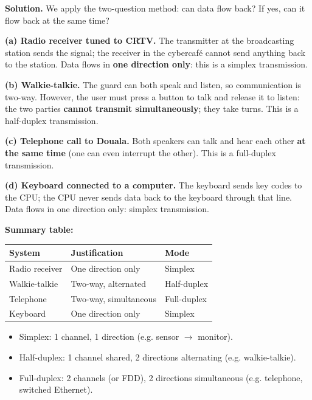\documentclass[11pt]{article}
\newcommand{\cle}[1]{{\popxbold\color{popdark}#1}}
\begin{document}
\begin{exoresolu}
\textbf{Solution.} We apply the two-question method: can data flow back? If yes, can it flow back at the same time?

\textbf{(a) Radio receiver tuned to CRTV.} The transmitter at the broadcasting station sends the signal; the receiver in the cybercaf\'e cannot send anything back to the station. Data flows in \textbf{one direction only}: this is a \cle{simplex} transmission.

\textbf{(b) Walkie-talkie.} The guard can both speak and listen, so communication is two-way. However, the user must press a button to talk and release it to listen: the two parties \textbf{cannot transmit simultaneously}; they take turns. This is a \cle{half-duplex} transmission.

\textbf{(c) Telephone call to Douala.} Both speakers can talk and hear each other \textbf{at the same time} (one can even interrupt the other). This is a \cle{full-duplex} transmission.

\textbf{(d) Keyboard connected to a computer.} The keyboard sends key codes to the CPU; the CPU never sends data back to the keyboard through that line. Data flows in one direction only: \cle{simplex} transmission.

\textbf{Summary table:}
\begin{center}
\begin{tabularx}{\linewidth}{|l|X|l|}
\hline
\rowcolor{popblueL} \textbf{System} & \textbf{Justification} & \textbf{Mode} \\
\hline
Radio receiver & One direction only & Simplex \\
\hline
Walkie-talkie & Two-way, alternated & Half-duplex \\
\hline
Telephone & Two-way, simultaneous & Full-duplex \\
\hline
Keyboard & One direction only & Simplex \\
\hline
\end{tabularx}
\end{center}
\end{exoresolu}

\begin{aretenir}
\begin{itemize}
\item Simplex: 1 channel, 1 direction (e.g. sensor $\to$ monitor).
\item Half-duplex: 1 channel shared, 2 directions alternating (e.g. walkie-talkie).
\item Full-duplex: 2 channels (or FDD), 2 directions simultaneous (e.g. telephone, switched Ethernet).
\end{itemize}
\end{aretenir}
\end{document}
